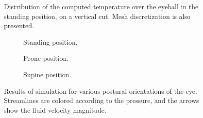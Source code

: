 \makeatletter
\newcommand\addplotgraphicsnatural[2][]{%
    \begingroup
    \pgfqkeys{/pgfplots/plot graphics}{#1}%
    \setbox0=\hbox{\texttt{[image: \#2]}}%
    \pgfmathparse{\wd0/(\pgfkeysvalueof{/pgfplots/plot graphics/xmax} - \pgfkeysvalueof{/pgfplots/plot graphics/xmin})}%
    \let\xunit=\pgfmathresult
    \pgfmathparse{\ht0/(\pgfkeysvalueof{/pgfplots/plot graphics/ymax} - \pgfkeysvalueof{/pgfplots/plot graphics/ymin})}%
    \let\yunit=\pgfmathresult
    \xdef\marshal{%
        \noexpand\pgfplotsset{unit vector ratio={\xunit\space \yunit}}%
    }%
    \endgroup
    \marshal
    \addplot graphics[#1] {#2};
}
\makeatother

\begin{figure}[!ht]
  \centering
  
  \caption{Distribution of the computed temperature over the eyeball in the standing position, on a vertical cut. Mesh discretization is also presented.}
  \label{fig:feelpp:wp1:hfheat}

\end{figure}


\begin{figure}[!ht]

  \def\subfigwidth{1.4\columnwidth}
  \begin{subfigure}[c]{0.32\textwidth}
    \centering
    
    \vspace{-1\baselineskip}
    \caption{Standing position.}
    \label{fig:feelpp:wp1:hf:standing}
  \end{subfigure}
  \begin{subfigure}[c]{0.32\textwidth}
    
    \vspace{-1\baselineskip}
    \caption{Prone position.}
    \label{fig:feelpp:wp1:hf:prone}
  \end{subfigure}
  \begin{subfigure}[c]{0.32\textwidth}
    
    \vspace{-1\baselineskip}
    \caption{Supine position.}
    \label{fig:feelpp:wp1:hf:supine}
  \end{subfigure}

  \caption{Results of simulation for various postural orientations of the eye. Streamlines are colored according to the pressure, and the arrows show the fluid velocity magnitude.}
  \label{fig:feelpp:wp1:hf}
\end{figure}




